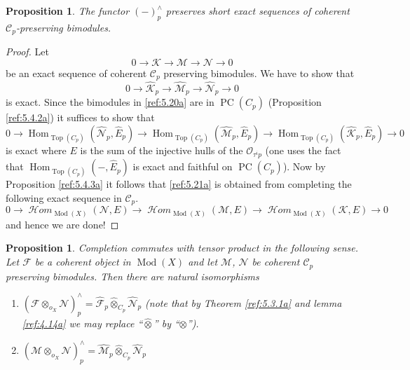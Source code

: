 \documentclass{amsproc}
\def\Cscr{{\mathcal C}}
\def\Fscr{{\mathcal F}}
\def\Hscr{{\mathcal H}}
\def\Kscr{{\mathcal K}}
\def\Mscr{{\mathcal M}}
\def\Nscr{{\mathcal N}}
\def\Oscr{{\mathcal O}}
\def\HHom{\operatorname {\Hscr \mathit{om}}}
\def\ctimes{\mathbin{\hat{\otimes}}}
\def\Hom{\operatorname {Hom}}
\def\HHom{\operatorname {\Hscr \mathit{om}}}
\def\Qch{\operatorname {Mod}}
\def\r{\rightarrow}
\DeclareMathOperator{\PC}{PC}
\DeclareMathOperator{\Top}{Top}
\newtheorem{propositions}[lemmas]{Proposition}
\theoremstyle{definition}
\theoremstyle{remark}
\numberwithin{equation}{section}
\numberwithin{table}{section}
\numberwithin{figure}{section}
\begin{document}
\begin{propositions} 
\label{ref:5.4.4a}
The functor $(-)_{p}^\wedge$ preserves short
exact sequences of 
coherent $\Cscr_{p}$-preserving bimodules.
\end{propositions}
\begin{proof}
Let 
\[
0\r \Kscr\r \Mscr\r \Nscr\r 0
\]
be an exact sequence of coherent $\Cscr_{p}$ preserving bimodules. We
have to show that 
\begin{equation}
\label{ref:5.20a}
0\r \hat{\Kscr}_p\r \hat{\Mscr}_p \r \hat{\Nscr}_p\r 0
\end{equation}
is exact. Since the bimodules in \eqref{ref:5.20a} are in $\PC(C_p)$
(Proposition \ref{ref:5.4.2a}) it suffices to show that 
\begin{equation}
\label{ref:5.21a}
0\r \Hom_{\Top(C_p)}(\hat{\Nscr}_p,\hat{E}_p)\r
\Hom_{\Top(C_p)}(\hat{\Mscr}_p,\hat{E}_p)\r
\Hom_{\Top(C_p)}(\hat{\Kscr}_p,\hat{E}_p)\r
0
\end{equation}
is exact where $E$ is the sum of the injective hulls of the $\Oscr_{\tau^i
p}$ (one uses the fact that $\Hom_{\Top(C_p)}(-,\hat{E}_p)$ is exact
and faithful on $\PC(C_p)$). Now by Proposition \ref{ref:5.4.3a} it
follows that \eqref{ref:5.21a} is obtained from completing the
following exact sequence in $\Cscr_p$.
\[
0\r \HHom_{\Qch(X)}(\Nscr,E)\r 
\HHom_{\Qch(X)}(\Mscr,E)\r 
\HHom_{\Qch(X)}(\Kscr,E)\r 
0
\]
and hence we are done!
\end{proof}
\begin{propositions} 
\label{ref:5.4.5a}
Completion commutes with tensor product in the
following sense. Let $\Fscr$ be a coherent object in $\Qch(X)$ and let
$\Mscr$, $\Nscr$ be coherent $\Cscr_{p}$ preserving bimodules. Then
there are natural isomorphisms
\begin{enumerate} 
\item $(\Fscr\otimes_{o_X} \Nscr)^\wedge_{p}=\hat{\Fscr}_{p}\ctimes_{C_p}
  \hat{\Nscr}_{p}$ (note that by Theorem \ref{ref:5.3.1a} and lemma
  \ref{ref:4.14a} we may replace ``$\ctimes$'' by ``$\otimes$'').
 \item $(\Mscr\otimes_{o_X}
 \Nscr)^\wedge_{p}=\hat{\Mscr}_{p}\ctimes_{C_p} 
 \hat{\Nscr}_{p}$
 \end{enumerate}
 \end{propositions}
\end{document}
